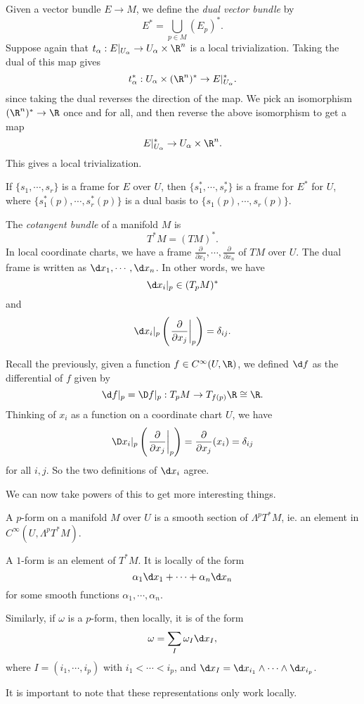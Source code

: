 \documentclass[a4paper]{article}
\begin{document}
\begin{defi}
  Given a vector bundle $E \to M$, we define the \emph{dual vector bundle} by
  \[
    E^* = \bigcup_{p \in M} (E_p)^*.
  \]
  Suppose again that $t_\alpha: E|_{U_\alpha} \to U_\alpha \times \R^n$ is a local trivialization. Taking the dual of this map gives
  \[
    t_\alpha^*: U_\alpha \times (\R^n)^* \to E|_{U_\alpha}^*.
  \]
  since taking the dual reverses the direction of the map. We pick an isomorphism $(\R^n)^* \to \R$ once and for all, and then reverse the above isomorphism to get a map
  \[
    E|_{U_\alpha}^* \to U_\alpha \times \R^n.
  \]
  This gives a local trivialization.
\end{defi}

If $\{s_1, \cdots, s_r\}$ is a frame for $E$ over $U$, then $\{s_1^*, \cdots, s_r^*\}$ is a frame for $E^*$ for $U$, where $\{s_1^{*}(p), \cdots, s_r^*(p)\}$ is a dual basis to $\{s_1(p), \cdots, s_r(p)\}$.

\begin{defi}
  The \emph{cotangent bundle} of a manifold $M$ is
  \[
    T^*M = (TM)^*.
  \]
  In local coordinate charts, we have a frame $\frac{\partial}{\partial x_1}, \cdots, \frac{\partial}{\partial x_n}$ of $TM$ over $U$. The dual frame is written as $\d x_1, \cdots, \d x_n$. In other words, we have
  \[
    \d x_i|_p \in (T_p M)^*
  \]
  and
  \[
    \d x_i|_p\left(\left.\frac{\partial}{\partial x_j}\right|_p\right) = \delta_{ij}.
  \]
\end{defi}

Recall the previously, given a function $f \in C^\infty(U, \R)$, we defined $\d f$ as the differential of $f$ given by
\[
  \d f|_p = \D f|_p: T_p M \to T_{f(p)} \R \cong \R.
\]
Thinking of $x_i$ as a function on a coordinate chart $U$, we have
\[
  \D x_i|_p \left(\left.\frac{\partial}{\partial x_j}\right|_p\right) = \frac{\partial}{\partial x_j}(x_i) = \delta_{ij}
\]
for all $i, j$. So the two definitions of $\d x_i$ agree.

We can now take powers of this to get more interesting things.
\begin{defi}[$p$-form]
  A $p$-form on a manifold $M$ over $U$ is a smooth section of $\Lambda^p T^*M$, ie. an element in $C^\infty (U, \Lambda^p T^*M)$.
\end{defi}

\begin{eg}
  A $1$-form is an element of $T^* M$. It is locally of the form
  \[
    \alpha_1 \d x_1 + \cdots + \alpha_n \d x_n
  \]
  for some smooth functions $\alpha_1, \cdots, \alpha_n$.

  Similarly, if $\omega$ is a $p$-form, then locally, it is of the form
  \[
    \omega = \sum_I \omega_I \d x_I,
  \]
  where $I = (i_1, \cdots, i_p)$ with $i_1 < \cdots < i_p$, and $\d x_I = \d x_{i_1} \wedge \cdots \wedge \d x_{i_p}$.
\end{eg}
It is important to note that these representations only work locally.
\end{document}
